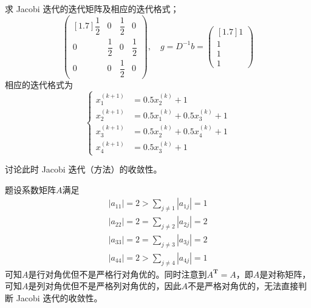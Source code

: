 \documentclass[11pt]{article}
\begin{document}
\begin{question}
\begin{subquestion}{求 Jacobi 迭代的迭代矩阵及相应的迭代格式；}
{\begin{equation*}
\begin{pmatrix}[1.7]
                    \dfrac{1}{2} & 0            & \dfrac{1}{2} & 0            \\
                    0            & \dfrac{1}{2} & 0            & \dfrac{1}{2} \\
                    0            & 0            & \dfrac{1}{2} & 0
                \end{pmatrix}
                ,\quad
                g = D^{-1}b =
                \begin{pmatrix}[1.7]
                    1 \\
                    1 \\
                    1 \\
                    1
                \end{pmatrix}
            \end{equation*}
            相应的迭代格式为
            \begin{equation*}
                \left\{
                \begin{aligned}
                    x_1^{(k + 1)} & = 0.5x_2^{(k)} + 1                \\
                    x_2^{(k + 1)} & = 0.5x_1^{(k)} + 0.5x_3^{(k)} + 1 \\
                    x_3^{(k + 1)} & = 0.5x_2^{(k)} + 0.5x_4^{(k)} + 1 \\
                    x_4^{(k + 1)} & = 0.5x_3^{(k)} + 1
                \end{aligned}
                \right.
            \end{equation*}
        }
    \end{subquestion}

    \begin{subquestion}{讨论此时 Jacobi 迭代（方法）的收敛性。}
        \answer
        {
            题设系数矩阵$A$满足
            \begin{align*}
                \left|a_{11}\right| = 2 > \sum_{j \neq 1}{\left|a_{1j}\right|} = 1 \\
                \left|a_{22}\right| = 2 = \sum_{j \neq 2}{\left|a_{2j}\right|} = 2 \\
                \left|a_{33}\right| = 2 = \sum_{j \neq 3}{\left|a_{3j}\right|} = 2 \\
                \left|a_{44}\right| = 2 > \sum_{j \neq 4}{\left|a_{4j}\right|} = 1
            \end{align*}
            可知$A$是行对角优但不是严格行对角优的。同时注意到$A^\mathbf{T} = A$，即$A$是对称矩阵，可知$A$是列对角优但不是严格列对角优的，因此$A$不是严格对角优的，无法直接判断 Jacobi 迭代的收敛性。

}
\end{subquestion}
\end{question}
\end{document}
